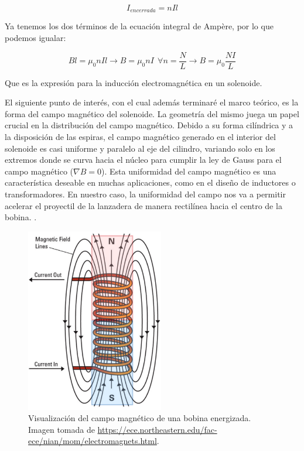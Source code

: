 \begin{center}
    \[I_{encerrada} = nIl\]
\end{center}

Ya tenemos los dos términos de la ecuación integral de Ampère, por lo que podemos igualar:

\begin{center}
    \[Bl=\mu_0nIl\to B=\mu_0nI~~\forall n=\frac{N}{L}\to B=\mu_0\frac{NI}{L}\]
\end{center}

Que es la expresión para la inducción electromagnética en un solenoide.

El siguiente punto de interés, con el cual además terminaré el marco teórico, es la forma del campo magnético del solenoide. La geometría del mismo juega un papel crucial en la distribución del campo magnético. Debido a su forma cilíndrica y a la disposición de las espiras, el campo magnético generado en el interior del solenoide es casi uniforme y paralelo al eje del cilindro, variando solo en los extremos donde se curva hacia el núcleo para cumplir la ley de Gauss para el campo magnético (\(\nabla B=0\)). Esta uniformidad del campo magnético es una característica deseable en muchas aplicaciones, como en el diseño de inductores o transformadores. En nuestro caso, la uniformidad del campo nos va a permitir acelerar el proyectil de la lanzadera de manera rectilínea hacia el centro de la bobina.\citep{purcell2013electricidad} \citep{griffiths2005}\citep{tipler2008}.

\begin{figure}[H]
    \centering %
    \includegraphics[width=6cm]{FigurasMemoria/electromagnet.png}
    \caption{Visualización del campo magnético de una bobina energizada. Imagen tomada de \href{URL}{https://ece.northeastern.edu/fac-ece/nian/mom/electromagnets.html}.}
    \label{fig:electromagnet} %
\end{figure}

